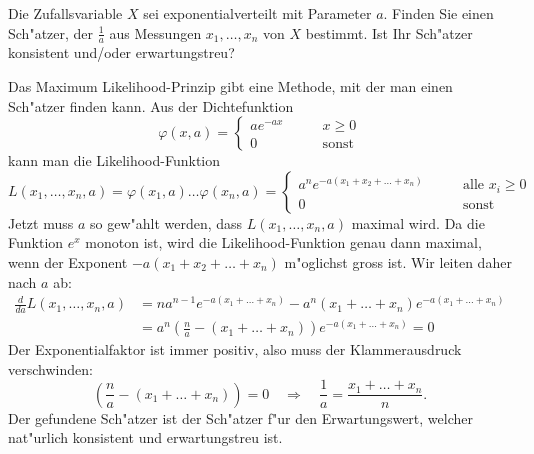 Die Zufallsvariable $X$ sei exponentialverteilt mit Parameter $a$.
Finden Sie einen Sch"atzer, der $\frac1a$ aus Messungen $x_1,\dots,x_n$
von $X$ bestimmt. Ist Ihr Sch"atzer konsistent und/oder erwartungstreu?

\begin{loesung}
Das Maximum Likelihood-Prinzip gibt eine Methode, mit der man einen
Sch"atzer finden kann. Aus der Dichtefunktion
\[
\varphi(x,a)=\begin{cases}
ae^{-ax}&\qquad x \ge 0\\
0&\qquad\text{sonst}
\end{cases}
\]
kann man die Likelihood-Funktion
\[
L(x_1,\dots,x_n,a)=\varphi(x_1,a)\dots\varphi(x_n,a)=
\begin{cases}
a^ne^{-a(x_1+x_2+\dots+x_n)}&\qquad \text{alle $x_i \ge 0$}\\
0&\qquad\text{sonst}
\end{cases}
\]
Jetzt muss $a$ so gew"ahlt werden, dass $L(x_1,\dots,x_n,a)$
maximal wird.
Da die Funktion $e^x$ monoton ist, wird die Likelihood-Funktion
genau dann maximal, wenn der Exponent
$-a(x_1+x_2+\dots+x_n)$ m"oglichst gross ist.
Wir leiten daher nach $a$ ab:
\begin{align*}
\frac{d}{da}L(x_1,\dots,x_n,a)&=na^{n-1}e^{-a(x_1+\dots+x_n)}-a^n(x_1+\dots+x_n)e^{-a(x_1+\dots+x_n)}\\
&=a^n
\left(\frac{n}a-(x_1+\dots+x_n)\right)
e^{-a(x_1+\dots+x_n)}=0
\end{align*}
Der Exponentialfaktor ist immer positiv, also muss der Klammerausdruck
verschwinden:
\[
\left(\frac{n}a-(x_1+\dots+x_n)\right)=0
\quad\Rightarrow\quad
\frac1a=\frac{x_1+\dots+x_n}{n}.
\]
Der gefundene Sch"atzer ist der Sch"atzer f"ur den Erwartungswert,
welcher nat"urlich konsistent und erwartungstreu ist.
\end{loesung}

